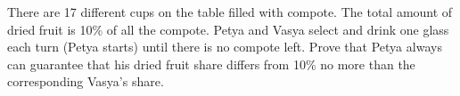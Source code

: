 \problem
There are 17 different cups on the table filled with compote. The total amount of dried fruit is 10\% of all the compote. Petya and Vasya select and drink one glass each turn (Petya starts) until there is no compote left. Prove that Petya always can guarantee that his dried fruit share differs from 10\% no more than the corresponding Vasya's share.
\solution
\endproblem
